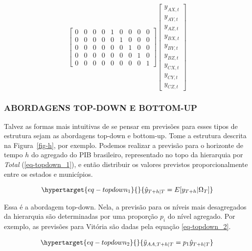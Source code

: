 \documentclass[
  12pt,
  oneside,
  a4paper,
  chapter=TITLE,
  section=TITLE,
  subsubsection=TITLE,
  brazil]{abntex2}
\begin{document}
\begin{equation}
{\begin{bmatrix}
    0 & 0 & 0 & 0 & 1 & 0 & 0 & 0 & 0 \\
    0 & 0 & 0 & 0 & 0 & 1 & 0 & 0 & 0 \\
    0 & 0 & 0 & 0 & 0 & 0 & 1 & 0 & 0 \\
    0 & 0 & 0 & 0 & 0 & 0 & 0 & 1 & 0 \\
    0 & 0 & 0 & 0 & 0 & 0 & 0 & 0 & 1
\end{bmatrix}
\begin{bmatrix}
    y_{AX, t} \\
    y_{AY, t} \\
    y_{AZ, t} \\
    y_{BX, t} \\
    y_{BY, t} \\
    y_{BZ, t} \\
    y_{CX, t} \\
    y_{CY, t} \\
    y_{CZ, t}
\end{bmatrix}
}\label{eq-matriz_ha}\end{equation}

\hypertarget{abordagens-top-down-e-bottom-up}{%
\subsubsection{ABORDAGENS TOP-DOWN E
BOTTOM-UP}\label{abordagens-top-down-e-bottom-up}}

Talvez as formas mais intuitivas de se pensar em previsões para esses
tipos de estrutura sejam as abordagens top-down e bottom-up. Tome a
estrutura descrita na Figura~\ref{fig-h}, por exemplo. Podemos realizar
a previsão para o horizonte de tempo \(h\) do agregado do PIB
brasileiro, representado no topo da hierarquia por \emph{Total}
(\ref{eq-topdown_1}), e então distribuir os valores previstos
proporcionalmente entre os estados e municípios.

\begin{equation}\protect\hypertarget{eq-topdown_1}{}{
\hat{y}_{T+h | T} = E[y_{T+h} | \Omega_T]
}\label{eq-topdown_1}\end{equation}

Essa é a abordagem top-down. Nela, a previsão para os níveis mais
desagregados da hierarquia são determinadas por uma proporção \(p_i\) do
nível agregado. Por exemplo, as previsões para Vitória são dadas pela
equação \ref{eq-topdown_2}.

\begin{equation}\protect\hypertarget{eq-topdown_2}{}{
\tilde{y}_{AA, T+h | T} = p_{1}\hat{y}_{T+h | T}
}\label{eq-topdown_2}\end{equation}
\end{document}
